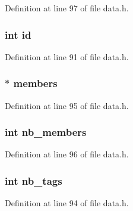 Definition at line 97 of file data.\+h.

\subsubsection[{\texorpdfstring{id}{id}}]{\setlength{\rightskip}{0pt plus 5cm}int id}\hypertarget{struct_relation_a7441ef0865bcb3db9b8064dd7375c1ea}{}\label{struct_relation_a7441ef0865bcb3db9b8064dd7375c1ea}


Definition at line 91 of file data.\+h.

\subsubsection[{\texorpdfstring{members}{members}}]{$\ast$ members}\hypertarget{struct_relation_a78ce2941ca07db1f266125961df9ce9b}{}\label{struct_relation_a78ce2941ca07db1f266125961df9ce9b}


Definition at line 95 of file data.\+h.

\subsubsection[{\texorpdfstring{nb\+\_\+members}{nb_members}}]{\setlength{\rightskip}{0pt plus 5cm}int nb\+\_\+members}\hypertarget{struct_relation_abe6a73091b8a8c9432bf4b149925229d}{}\label{struct_relation_abe6a73091b8a8c9432bf4b149925229d}


Definition at line 96 of file data.\+h.

\subsubsection[{\texorpdfstring{nb\+\_\+tags}{nb_tags}}]{\setlength{\rightskip}{0pt plus 5cm}int nb\+\_\+tags}\hypertarget{struct_relation_a5090182abe45c6d1577adb6c195378f3}{}\label{struct_relation_a5090182abe45c6d1577adb6c195378f3}


Definition at line 94 of file data.\+h.

